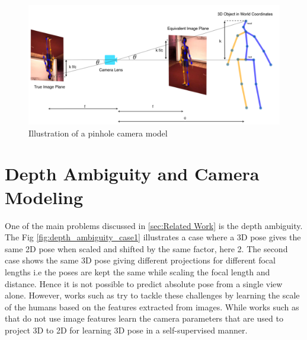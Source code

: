 \begin{figure}[h]
    \centering
    \includegraphics[scale=0.2]{figures/background/pinhole.png}
    \caption{Illustration of a pinhole camera model}
    \label{fig:pinhole}
\end{figure}

\section{Depth Ambiguity and Camera Modeling}
\label{sec:depth_ambiguity_camera_modeling}
One of the main problems discussed in \ref{sec:Related Work} is the depth ambiguity. The Fig \ref{fig:depth_ambiguity_case1} illustrates a case where a 3D pose gives the same 2D pose when scaled and shifted by the same factor, here 2. The second case shows the same 3D pose giving different projections for different focal lengths i.e the poses are kept the same while scaling the focal length and distance. Hence it is not possible to predict absolute pose from a single view alone. However, works such as \cite{CameraDistanceAware} try to tackle these challenges by learning the scale of the humans based on the features extracted from images. While works such as \cite{repnet,weaklymultiple} that do not use image features learn the camera parameters that are used to project 3D to 2D for learning 3D pose in a self-supervised manner. 

